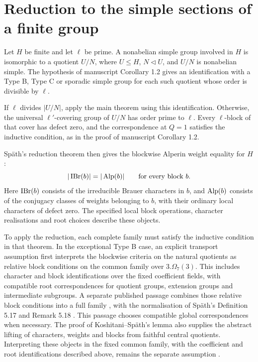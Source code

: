\section{Reduction to the simple sections of a finite group}

Let $H$ be finite and let $\ell$ be prime. A nonabelian simple group
involved in $H$ is isomorphic to a quotient $U/N$, where $U\leq H$,
$N\lhd U$, and $U/N$ is nonabelian simple. The hypothesis of
manuscript Corollary 1.2 gives an identification with a Type B, Type C or
sporadic simple group for each such quotient whose order is divisible by
$\ell$.

If $\ell$ divides $|U/N|$, apply the main theorem using this identification.
Otherwise, the universal $\ell'$-covering group of $U/N$ has order
prime to $\ell$. Every $\ell$-block of that cover has defect zero,
and the correspondence at $Q=1$ satisfies the inductive condition,
as in the proof of manuscript Corollary 1.2.

Sp\"ath's reduction theorem then gives the blockwise Alperin weight
equality for $H$ \cite[Theorem~A]{Spath2013}:
\[
 |\operatorname{IBr}(b)|=|\operatorname{Alp}(b)|\qquad\text{for every block }b.
\]
Here $\operatorname{IBr}(b)$ consists of the irreducible Brauer characters in $b$,
and $\operatorname{Alp}(b)$ consists of the conjugacy classes of weights belonging
to $b$, with their ordinary local characters of defect zero. The
specified local block operations, character realisations and root
choices describe these objects.

To apply the reduction, each complete family must satisfy the
inductive condition in that theorem. In the exceptional Type B case,
an explicit transport assumption first interprets the blockwise
criteria on the natural quotients as relative block conditions on
the common family over $3.\Omega_7(3)$. This includes character and
block identifications over the fixed coefficient fields, with compatible
root correspondences for quotient groups, extension groups and
intermediate subgroups. A separate published passage combines those
relative block conditions into a full family
\cite[Lemma~3.3]{KoshitaniSpath2016}, with the normalisation of
Sp\"ath's Definition 5.17 and Remark 5.18 \cite{Spath2013}.
This passage chooses compatible global correspondences when necessary.
The proof of Koshitani--Sp\"ath's lemma also supplies the abstract lifting of
characters, weights and blocks from faithful central quotients. Interpreting
these objects in the fixed common family, with the coefficient and root
identifications described above, remains the separate assumption
.

